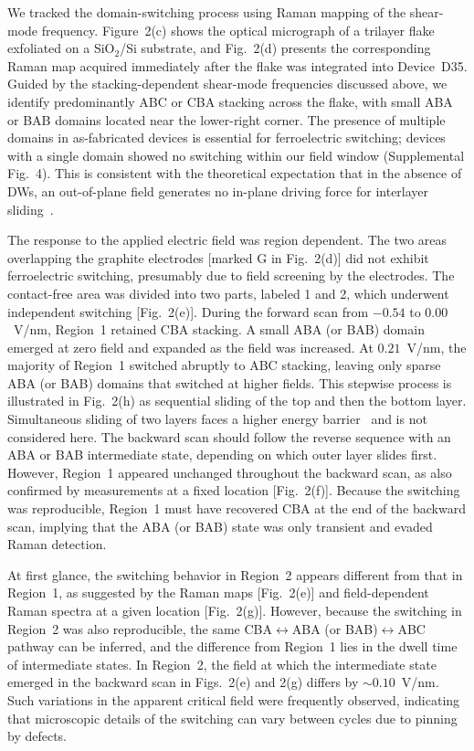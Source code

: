 \documentclass[
reprint,
superscriptaddress,









 amsmath,amssymb,
 aps,
 prb,






]{revtex4-2}
\begin{document}
We tracked the domain-switching process using Raman mapping of the shear-mode frequency. Figure~2(c) shows the optical micrograph of a trilayer flake exfoliated on a SiO$_2$/Si substrate, and Fig.~2(d) presents the corresponding Raman map acquired immediately after the flake was integrated into Device~D35. Guided by the stacking-dependent shear-mode frequencies discussed above, we identify predominantly ABC or CBA stacking across the flake, with small ABA or BAB domains located near the lower-right corner. The presence of multiple domains in as-fabricated devices is essential for ferroelectric switching; devices with a single domain showed no switching within our field window (Supplemental Fig.~4). This is consistent with the theoretical expectation that in the absence of DWs, an out-of-plane field generates no in-plane driving force for interlayer sliding~\cite{Ke2025}.


The response to the applied electric field was region dependent. The two areas overlapping the graphite electrodes [marked G in Fig.~2(d)] did not exhibit ferroelectric switching, presumably due to field screening by the electrodes. The contact-free area was divided into two parts, labeled 1 and 2, which underwent independent switching [Fig.~2(e)]. During the forward scan from $-0.54$ to $0.00$~V/nm, Region~1 retained CBA stacking. A small ABA (or BAB) domain emerged at zero field and expanded as the field was increased. At $0.21$~V/nm, the majority of Region~1 switched abruptly to ABC stacking, leaving only sparse ABA (or BAB) domains that switched at higher fields. This stepwise process is illustrated in Fig.~2(h) as sequential sliding of the top and then the bottom layer. Simultaneous sliding of two layers faces a higher energy barrier~\cite{Meng2022,Fan2025} and is not considered here. The backward scan should follow the reverse sequence with an ABA or BAB intermediate state, depending on which outer layer slides first. However, Region~1 appeared unchanged throughout the backward scan, as also confirmed by measurements at a fixed location [Fig.~2(f)]. Because the switching was reproducible, Region~1 must have recovered CBA at the end of the backward scan, implying that the ABA (or BAB) state was only transient and evaded Raman detection.

At first glance, the switching behavior in Region~2 appears different from that in Region~1, as suggested by the Raman maps [Fig.~2(e)] and field-dependent Raman spectra at a given location [Fig.~2(g)]. However, because the switching in Region~2 was also reproducible, the same CBA$\leftrightarrow$ABA (or BAB)$\leftrightarrow$ABC pathway can be inferred, and the difference from Region~1 lies in the dwell time of intermediate states. In Region~2, the field at which the intermediate state emerged in the backward scan in Figs.~2(e) and 2(g) differs by $\sim 0.10$~V/nm. Such variations in the apparent critical field were frequently observed, indicating that microscopic details of the switching can vary between cycles due to pinning by defects.
\end{document}
